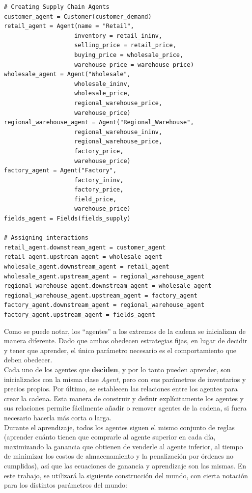 \begin{verbatim}
# Creating Supply Chain Agents
customer_agent = Customer(customer_demand)
retail_agent = Agent(name = "Retail", 
                    inventory = retail_ininv,
                    selling_price = retail_price,
                    buying_price = wholesale_price,
                    warehouse_price = warehouse_price)
wholesale_agent = Agent("Wholesale", 
                    wholesale_ininv, 
                    wholesale_price,
                    regional_warehouse_price,
                    warehouse_price)
regional_warehouse_agent = Agent("Regional_Warehouse", 
                    regional_warehouse_ininv, 
                    regional_warehouse_price,
                    factory_price, 
                    warehouse_price)
factory_agent = Agent("Factory",
                    factory_ininv,
                    factory_price,
                    field_price,
                    warehouse_price)
fields_agent = Fields(fields_supply)

# Assigning interactions
retail_agent.downstream_agent = customer_agent
retail_agent.upstream_agent = wholesale_agent
wholesale_agent.downstream_agent = retail_agent
wholesale_agent.upstream_agent = regional_warehouse_agent
regional_warehouse_agent.downstream_agent = wholesale_agent
regional_warehouse_agent.upstream_agent = factory_agent
factory_agent.downstream_agent = regional_warehouse_agent
factory_agent.upstream_agent = fields_agent

\end{verbatim}

Como se puede notar, los ``agentes'' a los extremos de la cadena se inicializan de manera diferente. Dado que ambos obedecen estrategias fijas, en lugar de decidir y tener que aprender, el \'unico par\'ametro necesario es el comportamiento que deben obedecer.\\

Cada uno de los agentes que \textbf{deciden}, y por lo tanto pueden aprender, son inicializados con la misma clase \textit{Agent}, pero con sus par\'ametros de inventarios y precios propios. Por \'ultimo, se establecen las relaciones entre los agentes para crear la cadena. Esta manera de construir y definir expl\'icitamente los agentes y sus relaciones permite f\'acilmente a\~nadir o remover agentes de la cadena, si fuera necesario hacerla m\'as corta o larga. \\

Durante el aprendizaje, todos los agentes siguen el mismo conjunto de reglas (aprender cu\'anto tienen que comprarle al agente superior en cada d\'ia, maximizando la ganancia que obtienen de venderle al agente inferior, al tiempo de minimizar los costos de almacenamiento y la penalizaci\'on por \'ordenes no cumplidas), as\'i que las ecuaciones de ganancia y aprendizaje son las mismas. En este trabajo, se utilizar\'a la siguiente construcci\'on del mundo, con cierta notaci\'on para los distintos par\'ametros del mundo:

